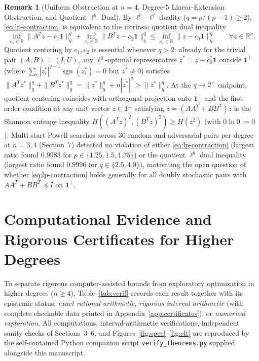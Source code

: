 \documentclass[11pt,a4paper]{article}
\theoremstyle{definition}
\newtheorem{remark}[theorem]{Remark}
\newcommand{\R}{\mathbb{R}}
\newcommand{\one}{\mathbf{1}}
\begin{document}
\begin{remark}[Uniform Obstruction at $n = 4$, Degree-$5$ Linear-Extension Obstruction, and Quotient $\ell^q$ Dual]
By $\ell^p$--$\ell^q$ duality ($q = p/(p-1) \ge 2$), \eqref{eq:lp-contraction} is equivalent to the intrinsic quotient dual inequality
\[
\inf_{c_1 \in \R}\|A^T z - c_1\one\|_q^q + \inf_{c_2 \in \R}\|B^T z - c_2\one\|_q^q \le \inf_{c_0 \in \R}\|z - c_0\one\|_q^q \qquad \forall z \in \R^n.
\]
Quotient centering by $c_1, c_2$ is essential whenever $q > 2$: already for the trivial pair $(A, B) = (I, U)$, any $\ell^q$-optimal representative $z^* = z - c_0^*\one$ outside $\one^\perp$ (where $\sum_i |z_i^*|^{q-1}\operatorname{sgn}(z_i^*) = 0$ but $\overline{z^*} \neq 0$) satisfies $\|A^T z^*\|_q^q + \|B^T z^*\|_q^q = \|z^*\|_q^q + n|\overline{z^*}|^q > \|z^*\|_q^q$. At the $q \to 2^+$ endpoint, quotient centering coincides with orthogonal projection onto $\one^\perp$ and the first-order condition at any unit vector $z \in \one^\perp$ satisfying $z = (AA^T+BB^T)z$ is the Shannon entropy inequality $H((A^T z)^2, (B^T z)^2) \ge H(z^2)$ (with $0\ln 0 := 0$). Multi-start Powell searches across $30$ random and adversarial pairs per degree at $n=3,4$ (Section~7) detected no violation of either \eqref{eq:lp-contraction} (largest ratio found $0.9983$ for $p \in \{1.25, 1.5, 1.75\}$) or the quotient $\ell^q$ dual inequality (largest ratio found $0.9996$ for $q \in \{2.5, 4.0\}$), motivating the open question of whether \eqref{eq:lp-contraction} holds generally for all doubly stochastic pairs with $AA^T + BB^T \preceq I$ on $\one^\perp$.
\end{remark}

\section{Computational Evidence and Rigorous Certificates for Higher Degrees}

To separate rigorous computer-assisted bounds from exploratory optimization in higher degrees ($n \ge 4$), Table~\ref{tab:verif} records each result together with its epistemic status: \emph{exact rational arithmetic}, \emph{rigorous interval arithmetic} (with complete checkable data printed in Appendix~\ref{app:certificates}), or \emph{numerical exploration}. All computations, interval-arithmetic verifications, independent sanity checks of Sections~3--6, and Figures~\ref{fig:spec}--\ref{fig:clt} are reproduced by the self-contained Python companion script \texttt{verify\_theorems.py} supplied alongside this manuscript.
\end{document}
